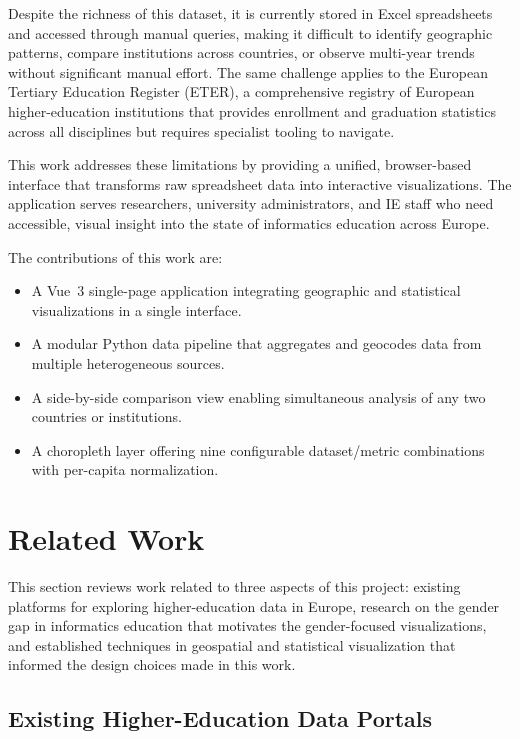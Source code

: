 \documentclass[final,3p,times,twocolumn]{elsarticle}
\begin{document}
Despite the richness of this dataset, it is currently stored in Excel spreadsheets and accessed through manual queries, making it difficult to identify geographic patterns, compare institutions across countries, or observe multi-year trends without significant manual effort. The same challenge applies to the European Tertiary Education Register (ETER), a comprehensive registry of European higher-education institutions that provides enrollment and graduation statistics across all disciplines but requires specialist tooling to navigate.

This work addresses these limitations by providing a unified, browser-based interface that transforms raw spreadsheet data into interactive visualizations. The application serves researchers, university administrators, and IE staff who need accessible, visual insight into the state of informatics education across Europe.

The contributions of this work are:
\begin{itemize}
    \item A Vue~3 single-page application integrating geographic and statistical visualizations in a single interface.
    \item A modular Python data pipeline that aggregates and geocodes data from multiple heterogeneous sources.
    \item A side-by-side comparison view enabling simultaneous analysis of any two countries or institutions.
    \item A choropleth layer offering nine configurable dataset/metric combinations with per-capita normalization.
\end{itemize}

\section{Related Work}
\label{sec:relatedwork}

This section reviews work related to three aspects of this project: existing platforms for exploring higher-education data in Europe, research on the gender gap in informatics education that motivates the gender-focused visualizations, and established techniques in geospatial and statistical visualization that informed the design choices made in this work.

\subsection{Existing Higher-Education Data Portals}
\end{document}
